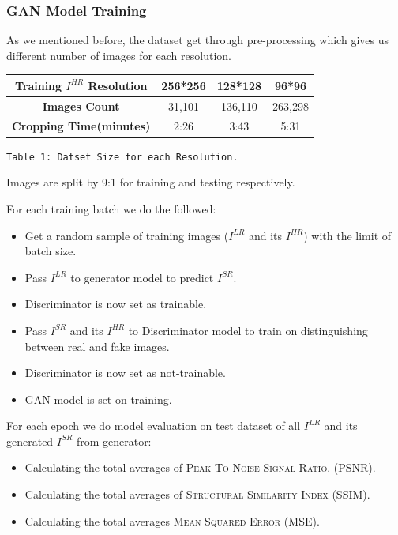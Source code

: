 \documentclass[12pt]{article}
\begin{document}
			\subsubsection{GAN Model Training}
				As we mentioned before, the dataset get through pre-processing which gives us different number of images for each resolution.
				\begin{center}
					\vspace{0.4in}
					\begin{tabular}{c|c|c|c}
						\textbf{Training $I^{HR}$ Resolution} & \textbf{256*256} & \textbf{128*128} & \textbf{96*96} \\\hline
						\textbf{Images Count} & 31,101 & 136,110 & 263,298\\\hline
						\textbf{Cropping Time(minutes)} & 2:26 & 3:43 & 5:31
					\end{tabular}
					\vspace{0.2in}
					
					\texttt{Table 1: Datset Size for each Resolution.}
					\vspace{0.1in}
				\end{center}
				
				Images are split by 9:1 for training and testing respectively.
				
				For each training batch we do the followed:
				\begin{itemize}
					\item Get a random sample of training images ($I^{LR}$ and its $I^{HR}$) with the limit of batch size.
					\item Pass $I^{LR}$ to generator model to predict $I^{SR}$.
					\item Discriminator is now set as trainable.
					\item Pass $I^{SR}$ and its $I^{HR}$ to Discriminator model to train on distinguishing between real and fake images.
					\item Discriminator is now set as not-trainable.
					\item GAN model is set on training.
				\end{itemize}
				
				For each epoch we do model evaluation on test dataset of all $I^{LR}$ and its generated $I^{SR}$ from generator:
				\begin{itemize}
					\item Calculating the total averages of \textsc{Peak-To-Noise-Signal-Ratio}. (PSNR).
					\item Calculating the total averages of \textsc{Structural Similarity Index} (SSIM).
					\item Calculating the total averages \textsc{Mean Squared Error} (MSE).
				\end{itemize}
	
\end{document}
